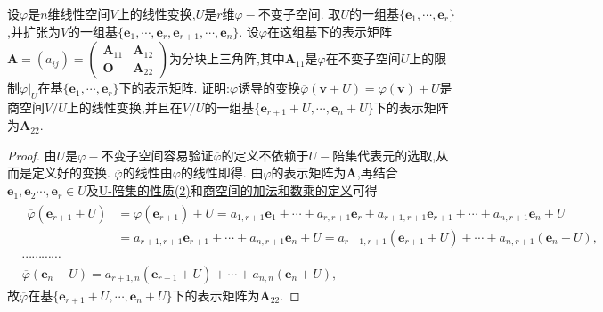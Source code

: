 \documentclass[../../main.tex]{subfiles}%
\begin{document}
\begin{proposition}\label{proposition:商空间下的线性变换对应表示矩阵}
设\(\varphi\)是\(n\)维线性空间\(V\)上的线性变换,\(U\)是\(r\)维\(\varphi -\)不变子空间. 取\(U\)的一组基\(\{\boldsymbol{e}_1,\cdots,\boldsymbol{e}_r\}\),并扩张为\(V\)的一组基\(\{\boldsymbol{e}_1,\cdots,\boldsymbol{e}_r,\boldsymbol{e}_{r + 1},\cdots,\boldsymbol{e}_n\}\). 设\(\varphi\)在这组基下的表示矩阵\(\boldsymbol{A}=(a_{ij})=\begin{pmatrix}\boldsymbol{A}_{11}&\boldsymbol{A}_{12}\\ \boldsymbol{O}&\boldsymbol{A}_{22}\end{pmatrix}\)为分块上三角阵,其中\(\boldsymbol{A}_{11}\)是\(\varphi\)在不变子空间\(U\)上的限制\(\varphi|_U\)在基\(\{\boldsymbol{e}_1,\cdots,\boldsymbol{e}_r\}\)下的表示矩阵. 证明:\(\varphi\)诱导的变换\(\overline{\varphi}(\boldsymbol{v}+U)=\varphi(\boldsymbol{v})+U\)是商空间\(V/U\)上的线性变换,并且在\(V/U\)的一组基\(\{\boldsymbol{e}_{r + 1}+U,\cdots,\boldsymbol{e}_n+U\}\)下的表示矩阵为\(\boldsymbol{A}_{22}\).
\end{proposition}
\begin{proof}
由\(U\)是\(\varphi -\)不变子空间容易验证\(\overline{\varphi}\)的定义不依赖于\(U -\)陪集代表元的选取,从而是定义好的变换. \(\overline{\varphi}\)的线性由\(\varphi\)的线性即得. 由\(\varphi\)的表示矩阵为\(\boldsymbol{A}\),再结合$\boldsymbol{e}_1,\boldsymbol{e}_2\cdots ,\boldsymbol{e}_r\in U$及\hyperref[proposition:U-陪集的性质]{U-陪集的性质(2)}和\hyperref[definition:U-陪集与商空间]{商空间的加法和数乘的定义}可得
\begin{align*}
&\begin{aligned}
\overline{\varphi }\left( \boldsymbol{e}_{r+1}+U \right) &=\varphi \left( \boldsymbol{e}_{r+1} \right) +U=a_{1,r+1}\boldsymbol{e}_1+\cdots +a_{r,r+1}\boldsymbol{e}_r+a_{r+1,r+1}\boldsymbol{e}_{r+1}+\cdots +a_{n,r+1}\boldsymbol{e}_n+U
\\
&=a_{r+1,r+1}\boldsymbol{e}_{r+1}+\cdots +a_{n,r+1}\boldsymbol{e}_n+U=a_{r+1,r+1}\left( \boldsymbol{e}_{r+1}+U \right) +\cdots +a_{n,r+1}\left( \boldsymbol{e}_n+U \right) ,
\end{aligned}
\\
&\cdots \cdots \cdots \cdots 
\\
&\overline{\varphi }(\boldsymbol{e}_n+U)=a_{r+1,n}(\boldsymbol{e}_{r+1}+U)+\cdots +a_{n,n}(\boldsymbol{e}_n+U),
\end{align*}
故\(\overline{\varphi}\)在基\(\{\boldsymbol{e}_{r + 1}+U,\cdots,\boldsymbol{e}_n+U\}\)下的表示矩阵为\(\boldsymbol{A}_{22}\). 
\end{proof}
\end{document}
